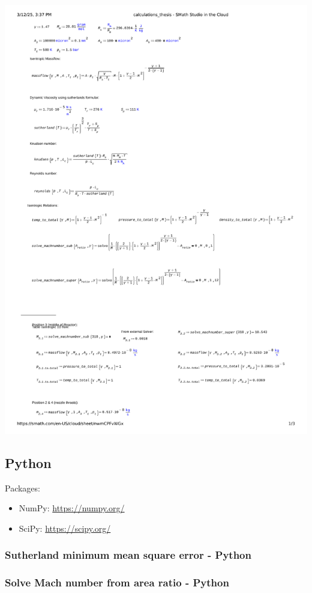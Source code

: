 \includegraphics[page=3, width=\textwidth]{code/smath.pdf}
\newpage

\subsection{Python}
Packages:
\begin{itemize}
	\item NumPy: \quad \url{https://numpy.org/}
	\item SciPy: \quad \url{https://scipy.org/}
\end{itemize}
\subsubsection{Sutherland minimum mean square error - Python}


\subsubsection{Solve Mach number from area ratio - Python}

